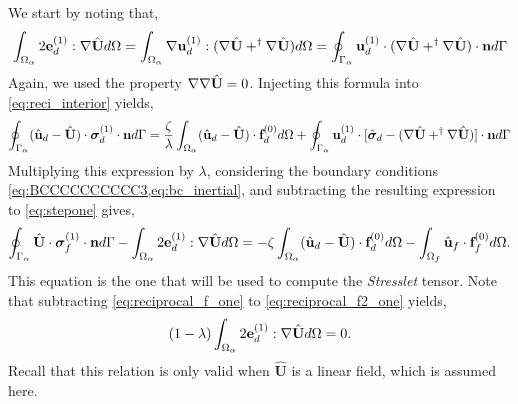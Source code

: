 We start by noting that, 
\begin{equation}
    \int_{\Omega_{\alpha}}  2\textbf{e}_d^{(1)} : \mathbf{\nabla} \hat{\textbf{U}}  d\Omega
    =\int_{\Omega_{\alpha}}  \mathbf{\nabla} \textbf{u}_d^{(1)} : (\mathbf{\nabla} \hat{\textbf{U}} +^\dagger \mathbf{\nabla} \hat{\textbf{U}})  d\Omega
    =
    \oint_{\Gamma_{\alpha}}   \textbf{u}_d^{(1)} \cdot (\mathbf{\nabla} \hat{\textbf{U}} + ^\dagger\mathbf{\nabla} \hat{\textbf{U}})  \cdot \textbf{n} d\Gamma
\end{equation}
Again, we used the property $\mathbf{\nabla}\mathbf{\nabla} \hat{\textbf{U}} = 0$. 
Injecting this formula into \ref{eq:reci_interior} yields,
\begin{equation*}
    \oint_{\Gamma_{\alpha}}  (\hat{\textbf{u}}_d - \hat{\textbf{U}})\cdot \bm\sigma_d^{(1)} \cdot \textbf{n} d\Gamma
    =
    \frac{\zeta}{\lambda} \int_{\Omega_{\alpha}} (\hat{\textbf{u}}_d - \hat{\textbf{U}}) \cdot \textbf{f}_d^{(0)} d\Omega
    + \oint_{\Gamma_{\alpha}} 
         \textbf{u}_d^{(1)}\cdot[\hat{\bm\sigma}_d  - (\mathbf{\nabla} \hat{\textbf{U}} + ^\dagger\mathbf{\nabla} \hat{\textbf{U}})]\cdot \textbf{n}
     d\Gamma
\end{equation*}
Multiplying this expression by $\lambda$, considering the boundary conditions \ref{eq:BCCCCCCCCCC3,eq:bc_inertial}, and subtracting the resulting expression to \ref{eq:stepone} gives,
\begin{equation}
    \intS{\hat{\textbf{U}}\cdot  \bm\sigma_f^{(1)} \cdot \textbf{n}}
    - \intO{
        2\textbf{e}_d^{(1)}:\grad \hat{\textbf{U}} 
   }
    = 
    - \zeta \intO{(\hat{\textbf{u}}_d - \hat{\textbf{U}}) \cdot \textbf{f}_d^{(0)}}
    - \intOf{\hat{\textbf{u}}_f\cdot  \textbf{f}^{(0)}_f}. 
    \label{eq:reciprocal_f2_one}
\end{equation}
This equation is the one that will be used to compute the \textit{Stresslet} tensor. 
Note that subtracting \ref{eq:reciprocal_f_one} to \ref{eq:reciprocal_f2_one} yields, 
\begin{equation}
    (1-\lambda)\intO{
        2\textbf{e}_d^{(1)}:\grad \hat{\textbf{U}} 
   }
    = 0. 
    \label{eq:shearrrrr}
\end{equation}
Recall that this relation is only valid when  $\hat{\textbf{U}}$ is a linear field, which is assumed here. 

